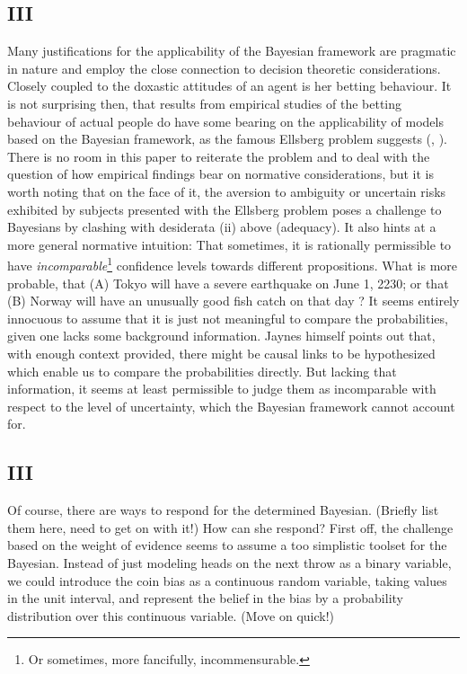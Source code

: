 \documentclass[11pt, a4paper]{scrartcl}
\begin{document}
\subsection{III}
Many justifications for the applicability of the Bayesian framework are pragmatic in nature and employ the close connection to decision theoretic considerations. Closely coupled to the doxastic attitudes of an agent is her betting behaviour. It is not surprising then, that results from empirical studies of the betting behaviour of actual people do have some bearing on the applicability of models based on the Bayesian framework, as the famous Ellsberg problem suggests (\cite{10.2307/1884324}, \cite{Camerer1992}). There is no room in this paper to reiterate the problem and to deal with the question of how empirical findings bear on normative considerations, but it is worth noting that on the face of it, the aversion to ambiguity or uncertain risks exhibited by subjects presented with the Ellsberg problem poses a challenge to Bayesians by clashing with desiderata (ii) above (adequacy). It also hints at a more general normative intuition: That sometimes, it is rationally permissible to have \emph{incomparable}\footnote{Or sometimes, more fancifully, incommensurable.} confidence levels towards different propositions. What is more probable, that (A) Tokyo will have a severe earthquake on June 1, 2230; or that (B) Norway will have an unusually good fish catch on that day \citep[p.658]{Jaynes2003-JAYPTT}? It seems entirely innocuous to assume that it is just not meaningful to compare the probabilities, given one lacks some background information. Jaynes himself points out that, with enough context provided, there might be causal links to be hypothesized which enable us to compare the probabilities directly. But lacking that information, it seems at least permissible to judge them as incomparable with respect to the level of uncertainty, which the Bayesian framework cannot account for. 
\subsection{III}

Of course, there are ways to respond for the determined Bayesian. (Briefly list them here, need to get on with it!) How can she respond? First off, the challenge based on the weight of evidence seems to assume a too simplistic toolset for the Bayesian. Instead of just modeling heads on the next throw as a binary variable, we could introduce the coin bias as a continuous random variable, taking values in the unit interval, and represent the belief in the bias by a probability distribution over this continuous variable. (Move on quick!) 
\end{document}
